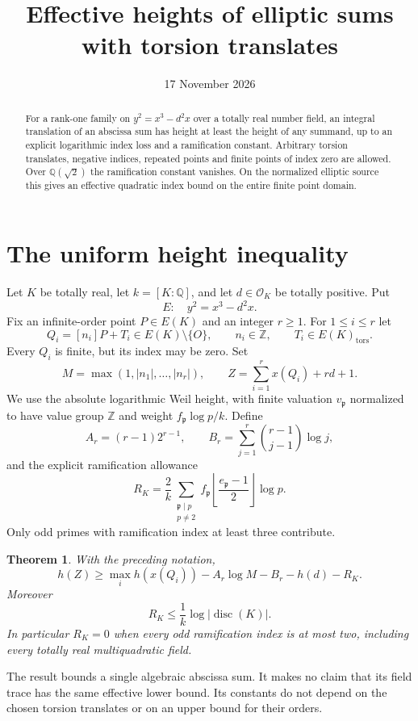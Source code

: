 \documentclass[11pt,a4paper]{article}
\title{Effective heights of elliptic sums with torsion translates}
\author{}\date{17 November 2026}
\newtheorem{theorem}{Theorem}[section]
\newcommand{\Q}{\mathbb Q}\newcommand{\Z}{\mathbb Z}
\begin{document}
\maketitle

\begin{abstract}
For a rank-one family on $y^2=x^3-d^2x$ over a totally real
number field, an integral translation of an abscissa sum has height
at least the height of any summand, up to an explicit logarithmic
index loss and a ramification constant. Arbitrary torsion translates,
negative indices, repeated points and finite points of index zero
are allowed. Over $\Q(\sqrt2)$ the ramification constant vanishes.
On the normalized elliptic source this gives an effective quadratic
index bound on the entire finite point domain.
\end{abstract}

\section{The uniform height inequality}

Let $K$ be totally real, let $k=[K:\Q]$, and let
$d\in\mathcal O_K$ be totally positive. Put
\[
 E:\quad y^2=x^3-d^2x.
\]
Fix an infinite-order point $P\in E(K)$ and an integer $r\ge1$.
For $1\le i\le r$ let
\[
 Q_i=[n_i]P+T_i\in E(K)\setminus\{O\},\qquad
 n_i\in\Z,\qquad T_i\in E(K)_{\mathrm{tors}}.
\]
Every $Q_i$ is finite, but its index may be zero. Set
\[
 M=\max(1,|n_1|,\ldots,|n_r|),\qquad
 Z=\sum_{i=1}^r x(Q_i)+rd+1.
\]
We use the absolute logarithmic Weil height, with finite valuation
$v_\mathfrak p$ normalized to have value group $\Z$ and weight
$f_\mathfrak p\log p/k$.
Define
\[
 A_r=(r-1)2^{r-1},\qquad
 B_r=\sum_{j=1}^r\binom{r-1}{j-1}\log j,
\]
and the explicit ramification allowance
\[
 R_K=\frac2k\sum_{\substack{\mathfrak p\mid p\\p\ne2}}
       f_\mathfrak p\left\lfloor\frac{e_\mathfrak p-1}{2}\right\rfloor\log p.
\]
Only odd primes with ramification index at least three contribute.

\begin{theorem}\label{thm:main}
With the preceding notation,
\[
 h(Z)\ge\max_i h(x(Q_i))-A_r\log M-B_r-h(d)-R_K.
\]
Moreover
\[
 R_K\le\frac1k\log|\operatorname{disc}(K)|.
\]
In particular $R_K=0$ when every odd ramification index is at most
two, including every totally real multiquadratic field.
\end{theorem}

The result bounds a single algebraic abscissa sum. It makes no
claim that its field trace has the same effective lower bound.
Its constants do not depend on the chosen torsion translates or
on an upper bound for their orders.
\end{document}
